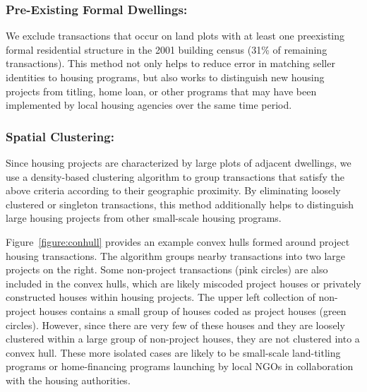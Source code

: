 \documentclass[12pt]{article}
\begin{document}
\subsubsection{Pre-Existing Formal Dwellings:}  


We exclude transactions that occur on land plots with at least one preexisting formal residential structure in the 2001 building census (31\% of remaining transactions).  This method not only helps to reduce error in matching seller identities to housing programs, but also works to distinguish new housing projects from titling, home loan, or other programs that may have been implemented by local housing agencies over the same time period.   

\subsubsection{Spatial Clustering:}  Since housing projects are characterized by large plots of adjacent dwellings, we use a density-based clustering algorithm to group transactions that satisfy the above criteria according to their geographic proximity.  By eliminating loosely clustered or singleton transactions, this method additionally helps to distinguish large housing projects from other small-scale housing programs.  

Figure~\ref{figure:conhull} provides an example convex hulls formed around project housing transactions.  The algorithm groups nearby transactions into two large projects on the right.  Some non-project transactions (pink circles) are also included in the convex hulls, which are likely miscoded project houses or privately constructed houses within housing projects.  The upper left collection of non-project houses contains a small group of houses coded as project houses (green circles).  However, since there are very few of these houses and they are loosely clustered within a large group of non-project houses, they are not clustered into a convex hull.  These more isolated cases are likely to be small-scale land-titling programs or home-financing programs launching by local NGOs in collaboration with the housing authorities.  
\end{document}
